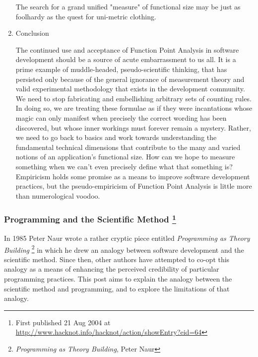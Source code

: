 \documentclass{article}
\begin{document}
\begin{enumerate}
The search for a grand unified "measure" of functional size may be just
as foolhardy as the quest for uni-metric clothing.

\item Conclusion
\label{sec:orgheadline386}

The continued use and acceptance of Function Point Analysis in software
development should be a source of acute embarrassment to us all. It is a
prime example of muddle-headed, pseudo-scientific thinking, that has
persisted only because of the general ignorance of measurement theory
and valid experimental methodology that exists in the development
community. We need to stop fabricating and embellishing arbitrary sets
of counting rules. In doing so, we are treating these formulae as if
they were incantations whose magic can only manifest when precisely the
correct wording has been discovered, but whose inner workings must
forever remain a mystery. Rather, we need to go back to basics and work
towards understanding the fundamental technical dimensions that
contribute to the many and varied notions of an application's functional
size. How can we hope to measure something when we can't even precisely
define what that something is? Empiricism holds some promise as a means
to improve software development practices, but the pseudo-empiricism of
Function Point Analysis is little more than numerological voodoo.
\end{enumerate}

\subsubsection{Programming and the Scientific Method \footnote{First published 21 Aug 2004 at
\url{http://www.hacknot.info/hacknot/action/showEntry?eid=64}}}
\label{sec:orgheadline400}

In 1985 Peter Naur wrote a rather cryptic piece entitled \emph{Programming as
Theory Building} \footnote{\emph{Programming as Theory Building}, Peter Naur} in which he drew an analogy between software
development and the scientific method. Since then, other authors have
attempted to co-opt this analogy as a means of enhancing the perceived
credibility of particular programming practices. This post aims to
explain the analogy between the scientific method and programming, and
to explore the limitations of that analogy.
\end{document}

